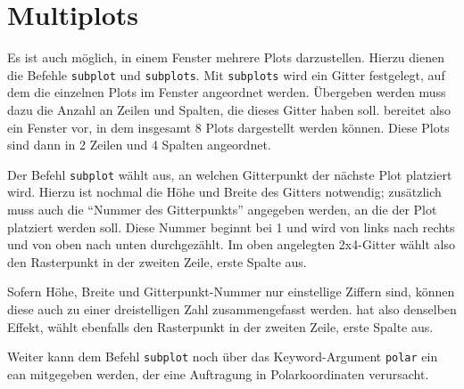 \section{Multiplots}
Es ist auch möglich, in einem Fenster mehrere Plots darzustellen. Hierzu dienen die Befehle \texttt{subplot} und \texttt{subplots}. Mit \texttt{subplots} wird ein Gitter festgelegt, auf dem die einzelnen Plots im Fenster angeordnet werden. Übergeben werden muss dazu die Anzahl an Zeilen und Spalten, die dieses Gitter haben soll.
bereitet also ein Fenster vor, in dem insgesamt 8 Plots dargestellt werden können. Diese Plots sind dann in 2 Zeilen und 4 Spalten angeordnet.

Der Befehl \texttt{subplot} wählt aus, an welchen Gitterpunkt der nächste Plot platziert wird. Hierzu ist nochmal die Höhe und Breite des Gitters notwendig; zusätzlich muss auch die \enquote{Nummer des Gitterpunkts} angegeben werden, an die der Plot platziert werden soll. Diese Nummer beginnt bei 1 und wird von links nach rechts und von oben nach unten durchgezählt.
Im oben angelegten 2x4-Gitter wählt also
den Rasterpunkt in der zweiten Zeile, erste Spalte aus.

Sofern Höhe, Breite und Gitterpunkt-Nummer nur einstellige Ziffern sind, können diese auch zu einer dreistelligen Zahl zusammengefasst werden.
hat also denselben Effekt, wählt ebenfalls den Rasterpunkt in der zweiten Zeile, erste Spalte aus.

Weiter kann dem Befehl \texttt{subplot} noch über das Keyword-Argument \texttt{polar} ein ean mitgegeben werden, der eine Auftragung in Polarkoordinaten verursacht.

